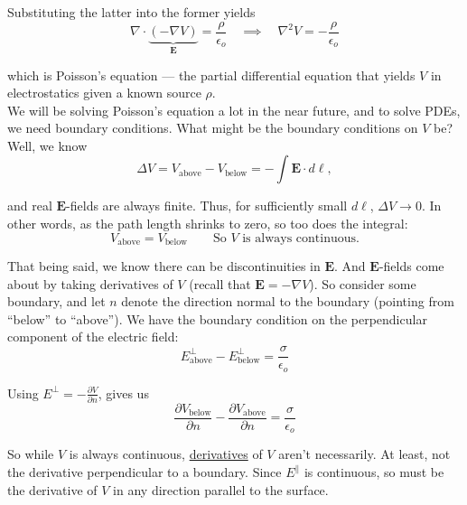 \documentclass{article}
\numberwithin{equation}{section}
\begin{document}
Substituting the latter into the former yields
\begin{equation*}
    \nabla \cdot \underbrace{\left( -\nabla V \right)}_{\displaystyle \bm{E}} = \frac{\rho}{\epsilon_o} \quad \implies \quad \boxed{\nabla^2 V = -\frac{\rho}{\epsilon_o}}
\end{equation*}

which is Poisson's equation --- the partial differential equation that yields $V$ in electrostatics given a known source $\rho$. \\

We will be solving Poisson's equation a lot in the near future, and to solve PDEs, we need boundary conditions. What might be the boundary conditions on $V$ be? \\

Well, we know
\begin{equation*}
    \Delta V = V_{\text{above}} - V_{\text{below}} = -\int \bm{E} \cdot d\bm{\ell},
\end{equation*}

and real $\bm{E}$-fields are always finite. Thus, for sufficiently small $d\bm{\ell}$, $\displaystyle \Delta V \to 0$. In other words, as the path length shrinks to zero, so too does the integral:
\begin{equation*}
    V_{\text{above}} = V_{\text{below}} \qquad \boxed{\text{So } V \text{ is always continuous.}}
\end{equation*}

That being said, we know there can be discontinuities in $\bm{E}$. And $\bm{E}$-fields come about by taking derivatives of $V$ (recall that $\bm{E} = -\nabla V$). So consider some boundary, and let $n$ denote the direction normal to the boundary (pointing from ``below'' to ``above''). We have the boundary condition on the perpendicular component of the electric field:
\begin{equation*}
    E_{\text{above}}^{\perp} - E_{\text{below}}^{\perp} = \frac{\sigma}{\epsilon_o}
\end{equation*}

Using $\displaystyle E^{\perp} = -\frac{\partial V}{\partial n}$, gives us
\begin{equation*}
    \boxed{\frac{\partial V_{\text{below}}}{\partial n} - \frac{\partial V_{\text{above}}}{\partial n} = \frac{\sigma}{\epsilon_o}}
\end{equation*}

So while $V$ is always continuous, \underline{derivatives} of $V$ aren't necessarily. At least, not the derivative perpendicular to a boundary. Since $E^{\parallel}$ is continuous, so must be the derivative of $V$ in any direction parallel to the surface. \\
\end{document}
